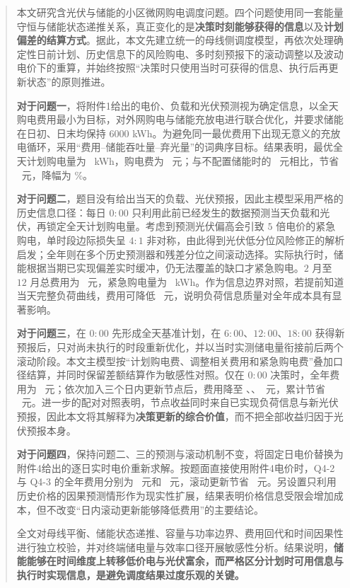 \maketitle
\thispagestyle{plain}
\begin{abstract}

本文研究含光伏与储能的小区微网购电调度问题。四个问题使用同一套能量守恒与储能状态递推关系，真正变化的是\textbf{决策时刻能够获得的信息}以及\textbf{计划偏差的结算方式}。据此，本文先建立统一的母线侧调度模型，再依次处理确定性日前计划、历史信息下的风险购电、多时刻预报下的滚动调整以及波动电价下的重算，并始终按照“决策时只使用当时可获得的信息、执行后再更新状态”的原则推进。

\textbf{对于问题一}，将附件1给出的电价、负载和光伏预测视为确定信息，以全天购电费用最小为目标，对外网购电与储能充放电进行联合优化，并要求储能在日初、日末均保持 $6000$ kWh。为避免同一最优费用下出现无意义的充放电循环，采用“费用--储能吞吐量--弃光量”的词典序目标。结果表明，最优全天计划购电量为 \QoneEnergy\ kWh，购电费为 \QoneCost\ 元；与不配置储能时的 \QoneNoStorage\ 元相比，节省 \QoneSave\ 元，降幅为 \QoneSavePct\%。

\textbf{对于问题二}，题目没有给出当天的负载、光伏预报，因此主模型采用严格的历史信息口径：每日 $0{:}00$ 只利用此前已经发生的数据预测当天负载和光伏，再锁定全天计划购电量。考虑到预测光伏偏高会引致 $5$ 倍电价的紧急购电，单时段边际损失呈 $4{:}1$ 非对称，由此得到光伏低分位风险修正的解析启发；全年则在多个历史预测器和残差分位之间滚动选择。实际执行时，储能根据当期已实现偏差实时缓冲，仍无法覆盖的缺口才紧急购电。$2$ 月至 $12$ 月总费用为 \QtwoTotal\ 元，紧急购电量为 \QtwoEmergency\ kWh。作为信息边界对照，若提前知道当天完整负荷曲线，费用可降低 \DeltaLoad\ 元，说明负荷信息质量对全年成本具有显著影响。

\textbf{对于问题三}，在 $0{:}00$ 先形成全天基准计划，在 $6{:}00$、$12{:}00$、$18{:}00$ 获得新预报后，只对尚未执行的时段重新优化，并以当时实测储电量衔接前后两个滚动阶段。本文主模型按“计划购电费、调整相关费用和紧急购电费”叠加口径结算，并同时保留差额结算作为敏感性对照。仅在 $0{:}00$ 决策时，全年费用为 \QthreeSzero\ 元；依次加入三个日内更新节点后，费用降至 \QthreeSone、\QthreeStwo、\QthreeSthree\ 元，累计节省 \QthreeVtotal\ 元。进一步的配对对照表明，节点收益同时来自已实现负荷信息与新光伏预报，因此本文将其解释为\textbf{决策更新的综合价值}，而不把全部收益归因于光伏预报本身。

\textbf{对于问题四}，保持问题二、三的预测与滚动机制不变，将固定日电价替换为附件4给出的逐日实时电价重新求解。按题面直接使用附件4电价时，Q4-2 与 Q4-3 的全年费用分别为 \QfourTwoMain\ 元和 \QfourThreeMain\ 元，滚动更新节省 \QfourRollPerfect\ 元。另设置只利用历史价格的因果预测情形作为现实性扩展，结果表明价格信息受限会增加成本，但不改变“日内滚动更新能够降低费用”的主要结论。

全文对母线平衡、储能状态递推、容量与功率边界、费用回代和时间因果性进行独立校验，并对终端储电量与效率口径开展敏感性分析。结果说明，\textbf{储能能够在时间维度上转移低价电与光伏富余，而严格区分计划时可用信息与执行时实现信息，是避免调度结果过度乐观的关键。}

\end{abstract}
